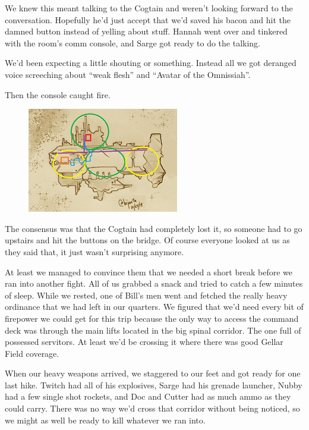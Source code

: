 We knew this meant talking to the Cogtain and weren’t looking forward to the conversation. 
Hopefully he’d just accept that we’d saved his bacon and hit the damned button instead of yelling about stuff. 
Hannah went over and tinkered with the room’s comm console, and Sarge got ready to do the talking.

We’d been expecting a little shouting or something. 
Instead all we got deranged voice screeching about “weak flesh” and “Avatar of the Omnissiah”. 

Then the console caught fire.

\begin{figure}
	\begin{center}
		\includegraphics[width=\figwidth]{pics/7/41.png}
	\end{center}
\end{figure}
The consensus was that the Cogtain had completely lost it, so someone had to go upstairs and hit the buttons on the bridge. 
Of course everyone looked at us as they said that, it just wasn’t surprising anymore.

At least we managed to convince them that we needed a short break before we ran into another fight. 
All of us grabbed a snack and tried to catch a few minutes of sleep. 
While we rested, one of Bill’s men went and fetched the really heavy ordinance that we had left in our quarters. 
We figured that we’d need every bit of firepower we could get for this trip because the only way to access the command deck was through the main lifts located in the big spinal corridor. 
The one full of possessed servitors. 
At least we’d be crossing it where there was good Gellar Field coverage.

When our heavy weapons arrived, we staggered to our feet and got ready for one last hike. 
Twitch had all of his explosives, Sarge had his grenade launcher, Nubby had a few single shot rockets, and Doc and Cutter had as much ammo as they could carry. 
There was no way we’d cross that corridor without being noticed, so we might as well be ready to kill whatever we ran into.

